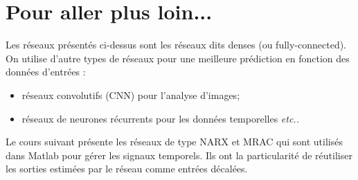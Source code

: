 \section{Pour aller plus loin...}

Les réseaux présentés ci-dessus sont les réseaux dits denses (ou fully-connected). On utilise d'autre types de réseaux pour une meilleure prédiction en fonction des données d'entrées : 
\begin{itemize}
\item réseaux convolutifs (CNN) pour l'analyse d'images;
\item réseaux de neurones récurrents pour les données temporelles \textit{etc..}
\end{itemize}

Le cours suivant présente les réseaux de type NARX et MRAC qui sont utilisés dans Matlab pour gérer les signaux temporels. Ils ont la particularité de réutiliser les sorties estimées par le réseau comme entrées décalées. 



